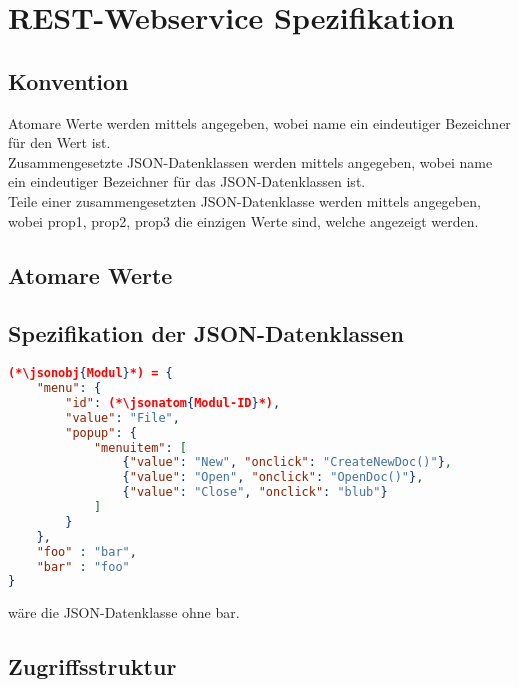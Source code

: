 \section{REST-Webservice Spezifikation}
\subsection{Konvention}
Atomare Werte werden mittels  angegeben, wobei name ein eindeutiger Bezeichner für den Wert ist.\\
Zusammengesetzte JSON-Datenklassen werden mittels  angegeben, wobei name ein eindeutiger Bezeichner für das JSON-Datenklassen ist.\\
Teile einer zusammengesetzten JSON-Datenklasse werden mittels  angegeben, wobei prop1, prop2, prop3 die einzigen Werte sind, welche angezeigt werden.



\subsection{Atomare Werte}

\subsection{Spezifikation der JSON-Datenklassen}
\begin{lstlisting}[language=json,firstnumber=-3]
(*\jsonobj{Modul}*) = {
	"menu": {
		"id": (*\jsonatom{Modul-ID}*),
		"value": "File",
		"popup": {
			"menuitem": [
				{"value": "New", "onclick": "CreateNewDoc()"},
				{"value": "Open", "onclick": "OpenDoc()"},
				{"value": "Close", "onclick": "blub"}
			]
		}
	},
	"foo" : "bar",
	"bar" : "foo"
}
\end{lstlisting}
 wäre die JSON-Datenklasse  ohne bar.
\subsection{Zugriffsstruktur}

